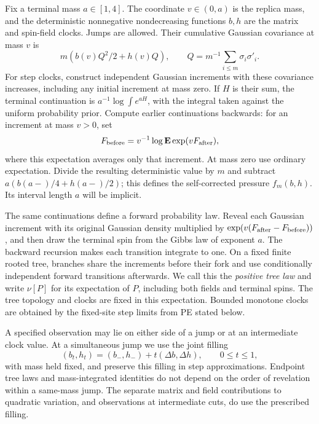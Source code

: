Fix a terminal mass \(a\in[1,4]\). The coordinate \(v\in(0,a)\)
is the replica mass, and the deterministic nonnegative nondecreasing
functions \(b,h\) are the matrix and spin-field clocks. Jumps are allowed.
Their cumulative Gaussian covariance at mass \(v\) is
\[
 m(b(v)Q^2/2+h(v)Q),\qquad
 Q=m^{-1}\sum_{i\le m}\sigma_i\sigma'_i.
\]
For step clocks, construct independent Gaussian increments with these
covariance increases, including any initial increment at mass zero.
If \(H\) is their sum, the terminal continuation is
\(a^{-1}\log\int e^{aH}\), with the integral taken against the uniform
probability prior. Compute earlier continuations backwards: for an
increment at mass \(v>0\), set
\[
 F_{\rm before}=v^{-1}\log\mathbf E\exp(vF_{\rm after}),
\]
where this expectation averages only that increment. At mass zero use
ordinary expectation. Divide the resulting deterministic value by \(m\)
and subtract \(a(b(a-)/4+h(a-)/2)\); this defines the self-corrected
pressure \(f_m(b,h)\). Its interval length \(a\) will be implicit.

The same continuations define a forward probability law. Reveal each
Gaussian increment with its original Gaussian density multiplied by
\(\exp(v(F_{\rm after}-F_{\rm before}))\), and then draw the terminal
spin from the Gibbs law of exponent \(a\). The backward recursion makes
each transition integrate to one. On a fixed finite rooted tree, branches
share the increments before their fork and use conditionally independent
forward transitions afterwards. We call this the \emph{positive tree law}
and write \(\nu[P]\) for its expectation of \(P\), including both fields
and terminal spins. The tree topology and clocks are fixed in this
expectation. Bounded monotone clocks are obtained by the fixed-site step
limits from PE stated below.

A specified observation may lie on either side of a jump or at an
intermediate clock value. At a simultaneous jump we use the joint filling
\[
 (b_t,h_t)=(b_-,h_-)+t(\Delta b,\Delta h),\qquad 0\le t\le1,
\]
with mass held fixed, and preserve this filling in step approximations.
Endpoint tree laws and mass-integrated identities do not depend on the
order of revelation within a same-mass jump. The separate matrix and
field contributions to quadratic variation, and observations at
intermediate cuts, do use the prescribed filling.

